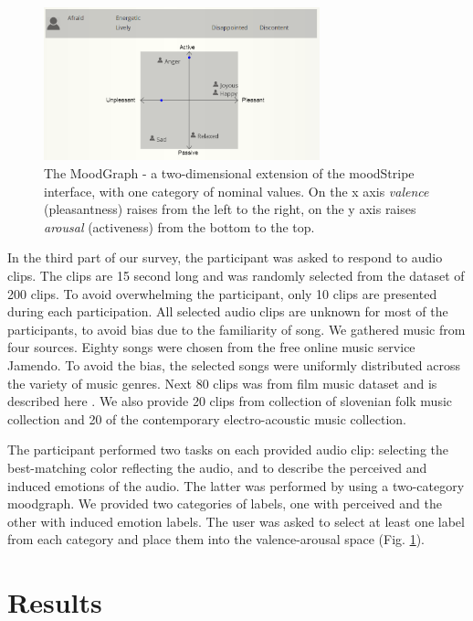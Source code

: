 \documentclass[a4paper]{article}
\begin{document}
\begin{figure}[ht]
\centering
\includegraphics[width=80mm]{moodgraph.png}
\caption{The MoodGraph - a two-dimensional extension of the moodStripe interface, with one category of nominal values. On the x axis \textit{valence} (pleasantness) raises from the left to the right, on the y axis raises \textit{arousal} (activeness) from the bottom to the top.}
\label{moodgraph}
\end{figure}

In the third part of our survey, the participant was asked to respond to audio clips. The clips are 15 second long and was randomly selected from the dataset of 200 clips. To avoid overwhelming the participant, only 10 clips are presented during each participation. All selected audio clips are unknown for most of the participants, to avoid bias due to the familiarity of song. We gathered music from four sources. Eighty songs were chosen from the free online music service Jamendo. To avoid the bias, the selected songs were uniformly distributed across the variety of music genres. Next 80 clips was from film music dataset and is described here \cite{eerola2010comparison}. We also provide 20 clips from collection of slovenian folk music collection and 20 of the contemporary electro-acoustic music collection. 

The participant performed two tasks on each provided audio clip: selecting the best-matching color reflecting the audio, and to describe the perceived and induced emotions of the audio. The latter was performed by using a two-category moodgraph. We provided two categories of labels, one with perceived and the other with induced emotion labels. The user was asked to select at least one label from each category and place them into the valence-arousal space (Fig. \ref{moodgraph}). 

\section{Results}
\end{document}
